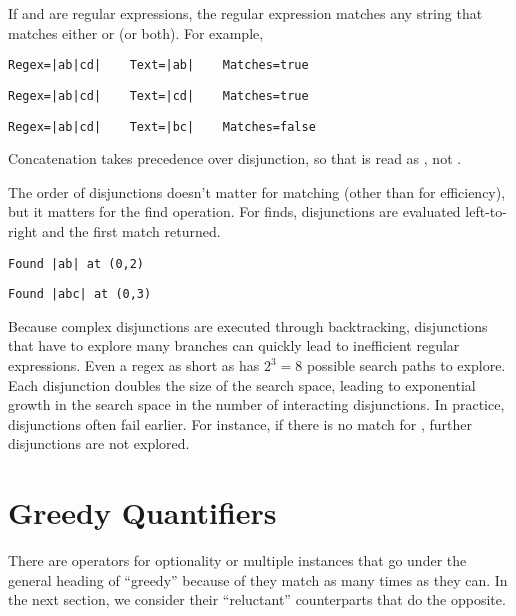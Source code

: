 If  and  are regular expressions, the regular
expression \code{|} matches any string that
matches either  or  (or both).  For example,
%
\begin{verbatim}
Regex=|ab|cd|    Text=|ab|    Matches=true
\end{verbatim}
%
\begin{verbatim}
Regex=|ab|cd|    Text=|cd|    Matches=true
\end{verbatim}
%
\begin{verbatim}
Regex=|ab|cd|    Text=|bc|    Matches=false
\end{verbatim}
%
Concatenation takes precedence over disjunction, so that 
is read as , not .  

The order of disjunctions doesn't matter for matching (other than for
efficiency), but it matters for the find operation.  For finds,
disjunctions are evaluated left-to-right and the first match returned.
%
\begin{verbatim}
Found |ab| at (0,2)
\end{verbatim}
%
\begin{verbatim}
Found |abc| at (0,3)
\end{verbatim}
%

Because complex disjunctions are executed through backtracking,
disjunctions that have to explore many branches can quickly lead to
inefficient regular expressions.  Even a regex as short as
 has $2^3 = 8$ possible search paths to explore.
Each disjunction doubles the size of the search space, leading to
exponential growth in the search space in the number of interacting
disjunctions.  In practice, disjunctions often fail earlier.  For
instance, if there is no match for , further
disjunctions are not explored.  

\section{Greedy Quantifiers}

There are operators for optionality or multiple instances that go
under the general heading of ``greedy'' because of they match as
many times as they can.  In the next section, we consider their
``reluctant'' counterparts that do the opposite.

